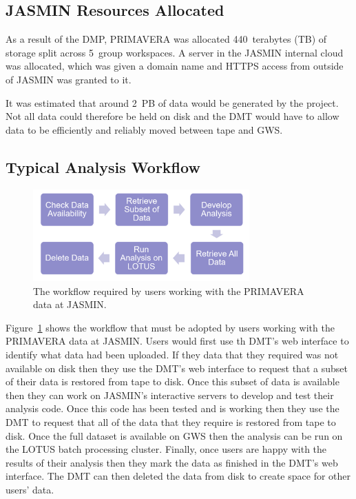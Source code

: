 \documentclass[gmd, manuscript]{copernicus}
\begin{document}
\subsection{JASMIN Resources Allocated}

As a result of the DMP, PRIMAVERA was allocated 440~terabytes (TB) of storage split across 5~group workspaces. A server in the JASMIN internal cloud was allocated, which was given a domain name and HTTPS access from outside of JASMIN was granted to it.

It was estimated that around 2~PB of data would be generated by the project. Not all data could therefore be held on disk and the DMT would have to allow data to be efficiently and reliably moved between tape and GWS.

\subsection{Typical Analysis Workflow}

\begin{figure}[t]
	\includegraphics[width=8.3cm]{analysis_workflow.png}
	\caption{The workflow required by users working with the PRIMAVERA data at JASMIN.}
	\label{analysis_workflow}
\end{figure}

Figure~\ref{analysis_workflow} shows the workflow that must be adopted by users working with the PRIMAVERA data at JASMIN. Users would first use th DMT's web interface to identify what data had been uploaded. If they data that they required was not available on disk then they use the DMT's web interface to request that a subset of their data is restored from tape to disk. Once this subset of data is available then they can work on JASMIN's interactive servers to develop and test their analysis code. Once this code has been tested and is working then they use the DMT to request that all of the data that they require is restored from tape to disk. Once the full dataset is available on GWS then the analysis can be run on the LOTUS batch processing cluster. Finally, once users are happy with the results of their analysis then they mark the data as finished in the DMT's web interface. The DMT can then deleted the data from disk to create space for other users' data.
\end{document}
